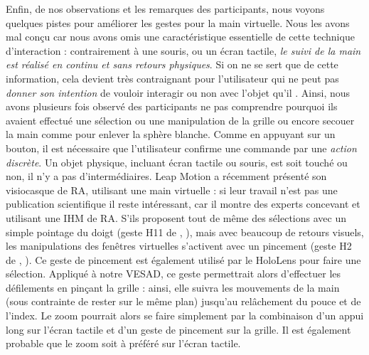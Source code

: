 Enfin, de nos observations et les remarques des participants, nous voyons quelques pistes pour améliorer les gestes pour la main virtuelle. Nous les avons mal conçu car nous avons omis une caractéristique essentielle de cette technique d'interaction : contrairement à une souris, ou un écran tactile, \emph{le suivi de la main est réalisé en continu et sans retours physiques}. Si on ne se sert que de cette information, cela devient très contraignant pour l'utilisateur qui ne peut pas \emph{donner son intention} de vouloir interagir ou non avec l'objet qu'il . Ainsi, nous avons plusieurs fois observé des participants ne pas comprendre pourquoi ils avaient effectué une sélection ou une manipulation de la grille ou encore secouer la main comme pour enlever la sphère blanche. Comme en appuyant sur un bouton, il est nécessaire que l'utilisateur confirme une commande par une \emph{action discrète}. Un objet physique, incluant écran tactile ou souris, est soit touché ou non, il n'y a pas d'intermédiaires. Leap Motion a récemment présenté son visiocasque de RA, utilisant une main virtuelle : si leur travail n'est pas une publication scientifique il reste intéressant, car il montre des experts concevant et utilisant une IHM de RA. S'ils proposent tout de même des sélections avec un simple pointage du doigt (geste H11 de \cite{Piumsomboon2013}, ), mais avec beaucoup de retours visuels, les manipulations des fenêtres virtuelles s'activent avec un pincement (geste H2 de \cite{Piumsomboon2013}, ). Ce geste de pincement est également utilisé par le HoloLens pour faire une sélection. Appliqué à notre VESAD, ce geste permettrait alors d'effectuer les défilements en pinçant la grille : ainsi, elle suivra les mouvements de la main (sous contrainte de rester sur le même plan) jusqu'au relâchement du pouce et de l'index. Le zoom pourrait alors se faire simplement par la combinaison d'un appui long sur l'écran tactile et d'un geste de pincement sur la grille. Il est également probable que le zoom soit à préféré sur l'écran tactile.

